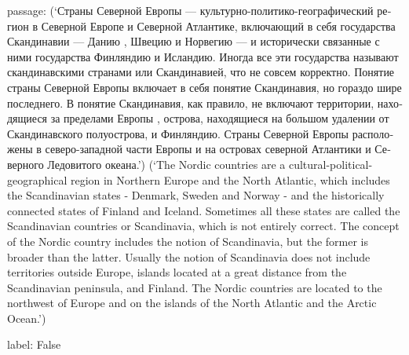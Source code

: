 \documentclass[11pt]{article}
\begin{document}
\begin{enumerate}
passage: \foreignlanguage{russian}{(`Страны Северной Европы — культурно-политико-географический регион в Северной Европе и Северной Атлантике, включающий в себя государства Скандинавии — Данию , Швецию и Норвегию — и исторически связанные с ними государства Финляндию и Исландию. Иногда все эти государства называют скандинавскими странами или Скандинавией, что не совсем корректно. Понятие страны Северной Европы включает в себя понятие Скандинавия, но гораздо шире последнего. В понятие Скандинавия, как правило, не включают территории, находящиеся за пределами Европы , острова, находящиеся на большом удалении от Скандинавского полуострова, и Финляндию. Страны Северной Европы расположены в северо-западной части Европы и на островах северной Атлантики и Северного Ледовитого океана.')} (`The Nordic countries are a cultural-political-geographical region in Northern Europe and the North Atlantic, which includes the Scandinavian states - Denmark, Sweden and Norway - and the historically connected states of Finland and Iceland. Sometimes all these states are called the Scandinavian countries or Scandinavia, which is not entirely correct. The concept of the Nordic country includes the notion of Scandinavia, but the former is broader than the latter. Usually the notion of Scandinavia does not include territories outside Europe, islands located at a great distance from the Scandinavian peninsula, and Finland. The Nordic countries are located to the northwest of Europe and on the islands of the North Atlantic and the Arctic Ocean.')

label: False

\end{enumerate}
\end{document}
